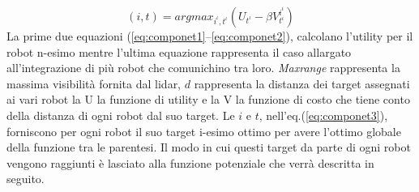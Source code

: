 \begin{equation}	
\label{eq:componet3}
(i,t) = argmax_{i^{\iota},t^{\iota}} (U_{t^{\iota}}  -\beta V^{i^{\iota}}_{t^{\iota}} ) 
\end{equation}
%
La prime due equazioni (\ref{eq:componet1}--\ref{eq:componet2}), calcolano 
l'utility per il robot n-esimo mentre l'ultima equazione rappresenta il caso 
allargato all'integrazione di più robot che comunichino tra loro. 
\emph{Maxrange} rappresenta la massima visibilità fornita dal lidar, $d$ 
rappresenta la distanza dei target assegnati ai vari robot la U la funzione di 
utility e la V la funzione di costo che tiene conto della distanza di ogni 
robot dal suo target. Le $i$ e $t$, nell'eq.(\ref{eq:componet3}),  forniscono 
per ogni robot il suo target i-esimo ottimo per avere l'ottimo globale della 
funzione tra le parentesi. 
Il modo in cui questi target da parte di ogni robot vengono raggiunti è 
lasciato alla funzione potenziale che verrà descritta in seguito.